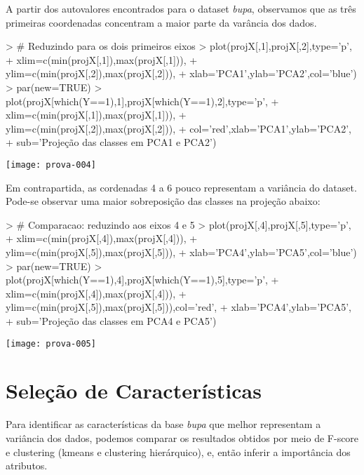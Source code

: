 \documentclass{article}
\begin{document}
A partir dos autovalores encontrados para o dataset \textit{bupa}, observamos que as três primeiras coordenadas concentram a maior parte da varância dos dados.
\begin{Schunk}
\begin{Sinput}
> # Reduzindo para os dois primeiros eixos
> plot(projX[,1],projX[,2],type='p',
+      xlim=c(min(projX[,1]),max(projX[,1])),
+      ylim=c(min(projX[,2]),max(projX[,2])),
+      xlab='PCA1',ylab='PCA2',col='blue')
> par(new=TRUE)
> plot(projX[which(Y==1),1],projX[which(Y==1),2],type='p',
+      xlim=c(min(projX[,1]),max(projX[,1])),
+      ylim=c(min(projX[,2]),max(projX[,2])),
+      col='red',xlab='PCA1',ylab='PCA2',
+      sub='Projeção das classes em PCA1 e PCA2')
\end{Sinput}
\end{Schunk}
\texttt{[image: prova-004]}

Em contrapartida, as cordenadas 4 a 6 pouco representam a variância do dataset. Pode-se observar uma maior sobreposição das classes na projeção abaixo:
\begin{Schunk}
\begin{Sinput}
> # Comparacao: reduzindo aos eixos 4 e 5
> plot(projX[,4],projX[,5],type='p',
+      xlim=c(min(projX[,4]),max(projX[,4])),
+      ylim=c(min(projX[,5]),max(projX[,5])),
+      xlab='PCA4',ylab='PCA5',col='blue')
> par(new=TRUE)
> plot(projX[which(Y==1),4],projX[which(Y==1),5],type='p',
+      xlim=c(min(projX[,4]),max(projX[,4])),
+      ylim=c(min(projX[,5]),max(projX[,5])),col='red',
+      xlab='PCA4',ylab='PCA5',
+      sub='Projeção das classes em PCA4 e PCA5')
\end{Sinput}
\end{Schunk}
\texttt{[image: prova-005]}

\section{Seleção de Características}
Para identificar as características da base \textit{bupa} que melhor representam a variância dos dados, podemos comparar os resultados obtidos por meio de F-score e clustering (kmeans e clustering hierárquico), e, então inferir a importância dos atributos.
\end{document}
